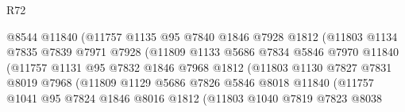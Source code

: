 \begin{lexlean}{R72}
\begin{coremodule}
                                  @8544
                                  @11840
                                  (@11757
                                    @1135
                                    @95
                                    @7840
                                    @1846
                                    @7928
                                    @1812
                                    (@11803
                                      @1134
                                      @7835
                                      @7839
                                      @7971
                                      @7928
                                      (@11809
                                        @1133
                                        @5686
                                        @7834
                                        @5846
                                        @7970
                                        @11840
                                        (@11757
                                          @1131
                                          @95
                                          @7832
                                          @1846
                                          @7968
                                          @1812
                                          (@11803
                                            @1130
                                            @7827
                                            @7831
                                            @8019
                                            @7968
                                            (@11809
                                              @1129
                                              @5686
                                              @7826
                                              @5846
                                              @8018
                                              @11840
                                              (@11757
                                                @1041
                                                @95
                                                @7824
                                                @1846
                                                @8016
                                                @1812
                                                (@11803
                                                  @1040
                                                  @7819
                                                  @7823
                                                  @8038

\end{coremodule}
\end{lexlean}
